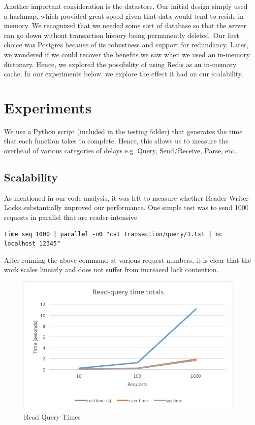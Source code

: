 \documentclass[titlepage, 11pt]{article}
\newcommand\0{\mathbf{0}}
\newcommand\<{\langle}
\renewcommand\>{\rangle}
\begin{document}
Another important consideration is the datastore. Our initial design simply used a hashmap, which provided great speed given that data would tend to reside in memory. We recognized that we needed some sort of database so that the server can go down without transaction history being permanently deleted. Our first choice was Postgres because of its robustness and support for redundancy. Later, we wondered if we could recover the benefits we saw when we used an in-memory dictonary. Hence, we explored the possibility of using Redis as an in-memory cache. In our experiments below, we explore the effect it had on our scalability.

\section{Experiments}


We use a Python script (included in the testing folder) that generates the time that each function takes to complete. Hence, this allows us to measure the overhead of various categories of delays e.g. Query, Send/Receive, Parse, etc.. 

\subsection{Scalability}

As mentioned in our code analysis, it was left to measure whether Reader-Writer Locks substantially improved our performance. One simple test was to send 1000 requests in parallel that are reader-intensive

\begin{lstlisting}
time seq 1000 | parallel -n0 "cat transaction/query/1.txt | nc localhost 12345"
\end{lstlisting}

After running the above command at various request numbers, it is clear that the work scales linearly and does not suffer from increased lock contention.

\begin{figure}[H]
\centering
\includegraphics[width=\linewidth]{read-query-times.png}
\caption{Read Query Times}
\end{figure}
\end{document}
